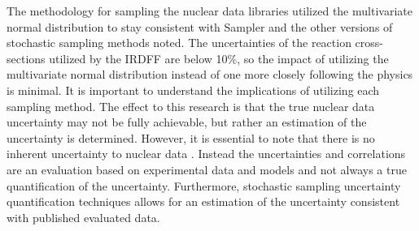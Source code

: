 The methodology for sampling the nuclear data libraries utilized the multivariate normal distribution to stay consistent with Sampler and the other versions of stochastic sampling methods noted. 
The uncertainties of the reaction cross-sections utilized by the IRDFF are below 10\%, so the impact of utilizing the multivariate normal distribution instead of one more closely following the physics is minimal. 
It is important to understand the implications of utilizing each sampling method. 
The effect to this research is that the true nuclear data uncertainty may not be fully achievable, but rather an estimation of the uncertainty is determined.
However, it is essential to note that there is no inherent uncertainty to nuclear data \cite{SCALE}. 
Instead the uncertainties and correlations are an evaluation based on experimental data and models and not always a true quantification of the uncertainty. 
Furthermore, stochastic sampling uncertainty quantification techniques allows for an estimation of the uncertainty consistent with published evaluated data.





